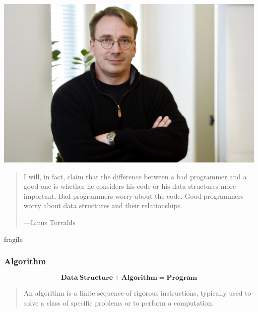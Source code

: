 \documentclass[aspectratio=169, 14pt]{beamer}
\begin{document}
\begin{frame}
    \begin{center}
        \includegraphics[height=.35\paperheight]{week0/linux}
    \end{center}
    \begin{quote}
        I will, in fact, claim that the difference between a bad programmer and a good one is whether he considers his code or his data structures more important. Bad programmers worry about the code. Good programmers worry about data structures and their relationships.
        \begin{flushright}
            ---Linus Torvalds
        \end{flushright}
    \end{quote}
\end{frame}

\begin{frame}{fragile}
    \frametitle{Algorithm}
    
    $$\mathbf{Data\ Structure + Algorithm = Program}$$

    \begin{quote}
        An algorithm is a finite sequence of rigorous instructions, typically used to solve a class of specific problems or to perform a computation. 
    \end{quote}
\pause
{}

\end{frame}
\end{document}

